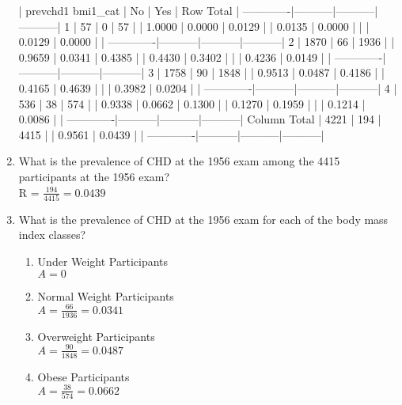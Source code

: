 \documentclass{article}
\begin{document}
\begin{enumerate}
\begin{Schunk}
\begin{Soutput}
 
             | prevchd1 
    bmi1_cat |        No |       Yes | Row Total | 
-------------|-----------|-----------|-----------|
           1 |        57 |         0 |        57 | 
             |    1.0000 |    0.0000 |    0.0129 | 
             |    0.0135 |    0.0000 |           | 
             |    0.0129 |    0.0000 |           | 
-------------|-----------|-----------|-----------|
           2 |      1870 |        66 |      1936 | 
             |    0.9659 |    0.0341 |    0.4385 | 
             |    0.4430 |    0.3402 |           | 
             |    0.4236 |    0.0149 |           | 
-------------|-----------|-----------|-----------|
           3 |      1758 |        90 |      1848 | 
             |    0.9513 |    0.0487 |    0.4186 | 
             |    0.4165 |    0.4639 |           | 
             |    0.3982 |    0.0204 |           | 
-------------|-----------|-----------|-----------|
           4 |       536 |        38 |       574 | 
             |    0.9338 |    0.0662 |    0.1300 | 
             |    0.1270 |    0.1959 |           | 
             |    0.1214 |    0.0086 |           | 
-------------|-----------|-----------|-----------|
Column Total |      4221 |       194 |      4415 | 
             |    0.9561 |    0.0439 |           | 
-------------|-----------|-----------|-----------|
\end{Soutput}
\end{Schunk}


  \item What is the prevalence of CHD at the 1956 exam among the 4415 participants at the 1956 exam?\\ R = \(\frac{194}{4415}= 0.0439\)\\
  \item What is the prevalence of CHD at the 1956 exam for each of the body mass index  classes? \\ 
  \begin{enumerate}
  \item Under Weight Participants\\
  \(A = 0\)\\
  \item Normal Weight Participants\\
  \(A = \frac{66}{1936}= 0.0341\) \\ 
  \item Overweight Participants\\
  \(A = \frac{90}{1848}= 0.0487\)\\
  \item Obese Participants\\
  \(A = \frac{38}{574}= 0.0662\)\\


\end{enumerate}
\end{enumerate}
\end{document}

